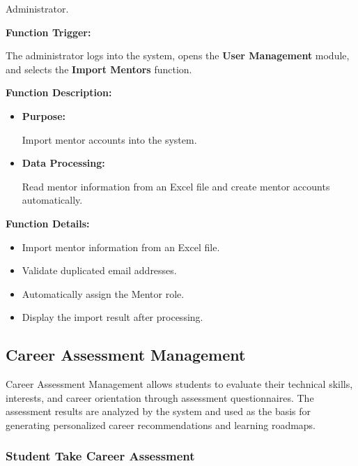 Administrator.

\vspace{0.3cm}

\textbf{Function Trigger:}

The administrator logs into the system, opens the \textbf{User Management} module, and selects the \textbf{Import Mentors} function.

\vspace{0.3cm}

\textbf{Function Description:}

\begin{itemize}
    \item \textbf{Purpose:}

    Import mentor accounts into the system.

    \item \textbf{Data Processing:}

    Read mentor information from an Excel file and create mentor accounts automatically.
\end{itemize}

\vspace{0.3cm}

\textbf{Function Details:}

\begin{itemize}
    \item Import mentor information from an Excel file.

    \item Validate duplicated email addresses.

    \item Automatically assign the Mentor role.

    \item Display the import result after processing.
\end{itemize}


\subsection{Career Assessment Management}

Career Assessment Management allows students to evaluate their technical skills, interests, and career orientation through assessment questionnaires. The assessment results are analyzed by the system and used as the basis for generating personalized career recommendations and learning roadmaps.
\subsubsection{Student Take Career Assessment}

